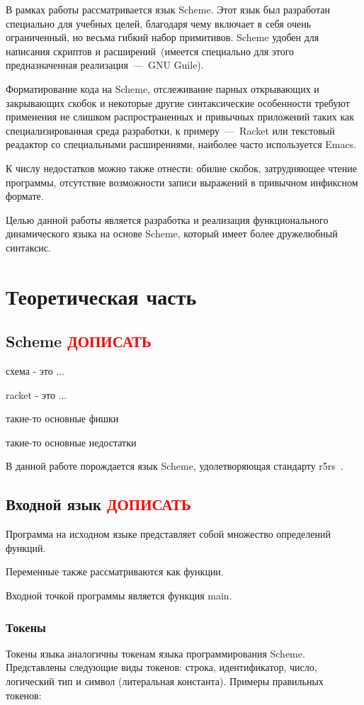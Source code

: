 \documentclass[12pt,a4paper,oneside]{extarticle}
\begin{document}
    В рамках работы рассматривается язык Scheme.
    Этот язык был разработан специально для учебных целей, благодаря чему включает в себя очень ограниченный, но весьма гибкий набор примитивов.
    Scheme удобен для написания скриптов и расширений~(имеется специально для этого предназначенная реализация~---~GNU Guile).

    Форматирование кода на Scheme, отслеживание парных открывающих и закрывающих скобок и некоторые другие синтаксические особенности требуют применения не слишком распространенных и привычных приложений таких как специализированная среда разработки, к примеру~---~Racket или текстовый реадактор со специальными расширениями, наиболее часто используется Emacs. 

    К числу недостатков можно также отнести: обилие скобок, затрудняющее чтение программы, отсутствие возможности записи выражений в привычном инфиксном формате.
    
    Целью данной работы является разработка и реализация функционального динамического языка на основе Scheme, который имеет более дружелюбный синтаксис.
\clearpage

\section{Теоретическая часть}
    \subsection{Scheme \textcolor{red}{ДОПИСАТЬ}}
        схема - это ...

        racket - это ...

        такие-то основные фишки

        такие-то основные недостатки

        В данной работе порождается язык Scheme, удолетворяющая стандарту r5rs~\cite{r5rs}.
    \subsection{Входной язык \textcolor{red}{ДОПИСАТЬ}}

        Программа на исходном языке представляет собой множество определений функций.

        Переменные также рассматриваются как функции.

        Входной точкой программы является функция main.

        \subsubsection{Токены}
            Токены языка аналогичны токенам языка программирования Scheme.
            Представлены следующие виды токенов: строка, идентификатор, число, логический тип и символ (литеральная константа). Примеры правильных токенов: 
\end{document}
